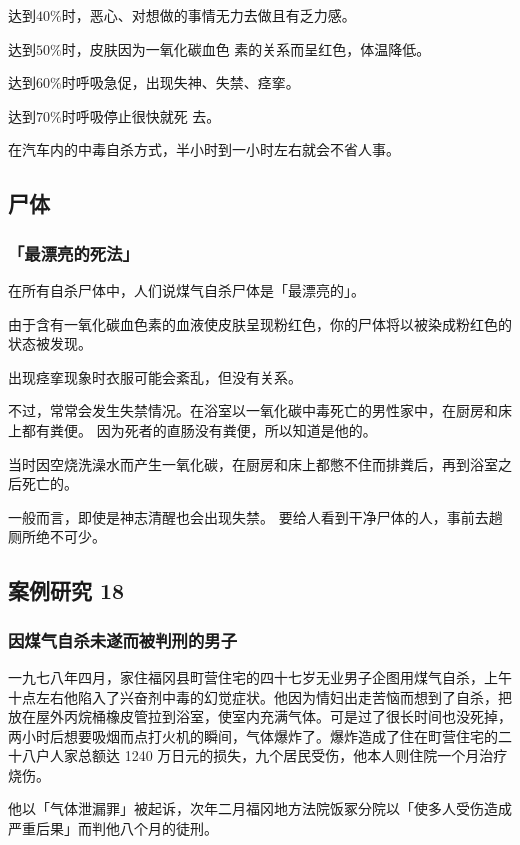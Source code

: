 \documentclass[UTF8]{ctexart}
\begin{document}
达到$40\%$时，恶心、对想做的事情无力去做且有乏力感。

达到$50\%$时，皮肤因为一氧化碳血色 素的关系而呈红色，体温降低。 

达到$60\%$时呼吸急促，出现失神、失禁、痉挛。

达到$70\%$时呼吸停止很快就死 去。 

在汽车内的中毒自杀方式，半小时到一小时左右就会不省人事。

\subsection{尸体}

\subsubsection*{「最漂亮的死法」}

在所有自杀尸体中，人们说煤气自杀尸体是「最漂亮的」。

由于含有一氧化碳血色素的血液使皮肤呈现粉红色，你的尸体将以被染成粉红色的状态被发现。

出现痉挛现象时衣服可能会紊乱，但没有关系。

不过，常常会发生失禁情况。在浴室以一氧化碳中毒死亡的男性家中，在厨房和床上都有粪便。
因为死者的直肠没有粪便，所以知道是他的。

当时因空烧洗澡水而产生一氧化碳，在厨房和床上都憋不住而排粪后，再到浴室之后死亡的。

一般而言，即使是神志清醒也会出现失禁。
要给人看到干净尸体的人，事前去趟厕所绝不可少。

\subsection{案例研究 18}

\subsubsection*{因煤气自杀未遂而被判刑的男子}

一九七八年四月，家住福冈县町营住宅的四十七岁无业男子企图用煤气自杀，上午十点左右他陷入了兴奋剂中毒的幻觉症状。他因为情妇出走苦恼而想到了自杀，把放在屋外丙烷桶橡皮管拉到浴室，使室内充满气体。可是过了很长时间也没死掉，两小时后想要吸烟而点打火机的瞬间，气体爆炸了。爆炸造成了住在町营住宅的二十八户人家总额达 1240 万日元的损失，九个居民受伤，他本人则住院一个月治疗烧伤。

他以「气体泄漏罪」被起诉，次年二月福冈地方法院饭冢分院以「使多人受伤造成严重后果」而判他八个月的徒刑。
\end{document}
